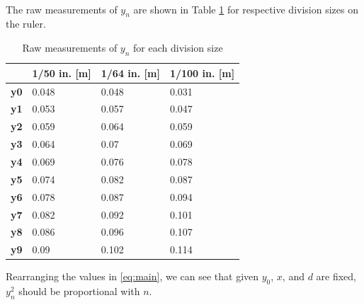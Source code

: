 \documentclass{article}
\begin{document}
\paragraph{}
The raw measurements of $y_n$ are shown in Table \ref{tb:raw_data} for respective division sizes on the ruler.

\begin{table}[h]
\begin{tabular}{l|l|l|l|}
\cline{2-4}
                                  & \textbf{1/50 in. {[}m{]}} & \textbf{1/64 in. {[}m{]}} & \textbf{1/100 in. {[}m{]}} \\ \hline
\multicolumn{1}{|l|}{\textbf{y0}} & 0.048                     & 0.048                     & 0.031                      \\ \hline
\multicolumn{1}{|l|}{\textbf{y1}} & 0.053                     & 0.057                     & 0.047                      \\ \hline
\multicolumn{1}{|l|}{\textbf{y2}} & 0.059                     & 0.064                     & 0.059                      \\ \hline
\multicolumn{1}{|l|}{\textbf{y3}} & 0.064                     & 0.07                      & 0.069                      \\ \hline
\multicolumn{1}{|l|}{\textbf{y4}} & 0.069                     & 0.076                     & 0.078                      \\ \hline
\multicolumn{1}{|l|}{\textbf{y5}} & 0.074                     & 0.082                     & 0.087                      \\ \hline
\multicolumn{1}{|l|}{\textbf{y6}} & 0.078                     & 0.087                     & 0.094                      \\ \hline
\multicolumn{1}{|l|}{\textbf{y7}} & 0.082                     & 0.092                     & 0.101                      \\ \hline
\multicolumn{1}{|l|}{\textbf{y8}} & 0.086                     & 0.096                     & 0.107                      \\ \hline
\multicolumn{1}{|l|}{\textbf{y9}} & 0.09                      & 0.102                     & 0.114                      \\ \hline
\end{tabular}
\caption{Raw measurements of $y_n$ for each division size}
\label{tb:raw_data}
\end{table}

Rearranging the values in \eqref{eq:main}, we can see that given $y_{0}$, $x$, and $d$ are fixed, $y_{n}^{2}$ should be proportional with $n$.
\end{document}
